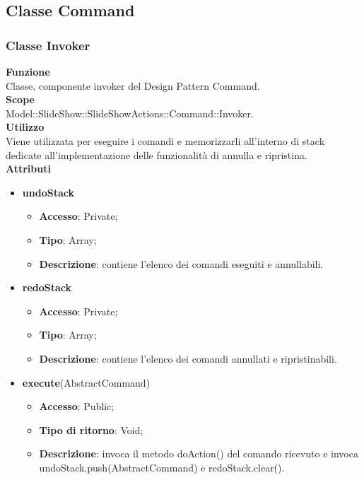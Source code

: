 \subsection{Classe Command}{
	\subsubsection{Classe Invoker}{
	\textbf{Funzione}\\
		\indent Classe, componente invoker del Design Pattern Command.\\
	\textbf{Scope}\\
		\indent Model::SlideShow::SlideShowActions::Command::Invoker.\\
	\textbf{Utilizzo}\\
		\indent Viene utilizzata per eseguire i comandi e memorizzarli all’interno di stack dedicate all’implementazione delle funzionalità di annulla e ripristina.\\
	\textbf{Attributi}
	\begin{itemize}
		\item \textbf{undoStack}
		\begin{itemize}
			\item \textbf{Accesso}: Private;
			\item \textbf{Tipo}: Array;
			\item \textbf{Descrizione}: contiene l’elenco dei comandi eseguiti e annullabili.
		\end{itemize}
		\item \textbf{redoStack}
		\begin{itemize}
			\item \textbf{Accesso}: Private;
			\item \textbf{Tipo}: Array;
			\item \textbf{Descrizione}: contiene l’elenco dei comandi annullati e ripristinabili.
		\end{itemize}
	\end{itemize}
	\begin{itemize}
		\item \textbf{execute}(AbstractCommand)
		\begin{itemize}
			\item \textbf{Accesso}: Public;
			\item \textbf{Tipo di ritorno}: Void;
			\item \textbf{Descrizione}: invoca il metodo doAction() del comando ricevuto e invoca
			undoStack.push(AbstractCommand) e redoStack.clear().
		\end{itemize}

\end{itemize}}}
